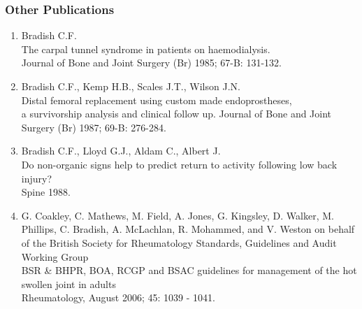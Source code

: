 \documentclass[margin,line]{res}
\begin{document}
\begin{resume}
\subsubsection{Other Publications}
\begin{enumerate}
\item Bradish C.F.\\
The carpal tunnel syndrome in patients on haemodialysis.\\
Journal of Bone and Joint Surgery (Br) 1985; 67-B: 131-132.
\item Bradish C.F., Kemp H.B., Scales J.T., Wilson J.N.\\
Distal femoral replacement using custom made endoprostheses,\\
a survivorship analysis and clinical follow up.
Journal of Bone and Joint Surgery (Br) 1987; 69-B: 276-284.
\item Bradish C.F., Lloyd G.J., Aldam C., Albert J.\\
Do non-organic signs help to predict return to activity following low back injury?\\
Spine 1988.
\item G. Coakley, C. Mathews, M. Field, A. Jones, G. Kingsley, D. Walker, M. Phillips, C. Bradish, A. McLachlan, R. Mohammed, and V. Weston on behalf of the British Society for Rheumatology Standards, Guidelines and Audit Working Group\\
BSR \& BHPR, BOA, RCGP and BSAC guidelines for management of the hot swollen joint in adults\\
Rheumatology, August 2006; 45: 1039 - 1041.
\end{enumerate}

\end{resume}
\end{document}
